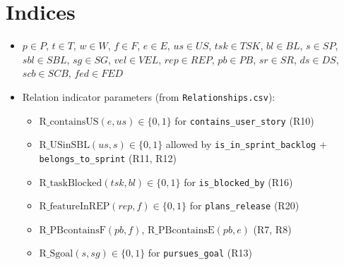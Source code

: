 \documentclass[11pt,a4paper]{article}
\begin{document}
\section{Indices}
\begin{itemize}[leftmargin=2em]
  \item $p\in P$, $t\in T$, $w\in W$, $f\in F$, $e\in E$, $us\in US$, $tsk\in TSK$, $bl\in BL$, $s\in SP$, $sbl\in SBL$, $sg\in SG$, $vel\in VEL$, $rep\in REP$, $pb\in PB$, $sr\in SR$, $ds\in DS$, $scb\in SCB$, $fed\in FED$
  \item Relation indicator parameters (from \texttt{Relationships.csv}): 
  \begin{itemize}
    \item $\text{R\_containsUS}(e,us)\in\{0,1\}$ for \texttt{contains\_user\_story} (R10)
    \item $\text{R\_USinSBL}(us,s)\in\{0,1\}$ allowed by \texttt{is\_in\_sprint\_backlog} + \texttt{belongs\_to\_sprint} (R11, R12)
    \item $\text{R\_taskBlocked}(tsk,bl)\in\{0,1\}$ for \texttt{is\_blocked\_by} (R16)
    \item $\text{R\_featureInREP}(rep,f)\in\{0,1\}$ for \texttt{plans\_release} (R20)
    \item $\text{R\_PBcontainsF}(pb,f)$, $\text{R\_PBcontainsE}(pb,e)$ (R7, R8)
    \item $\text{R\_Sgoal}(s,sg)\in\{0,1\}$ for \texttt{pursues\_goal} (R13)
  \end{itemize}
\end{itemize}
\end{document}
